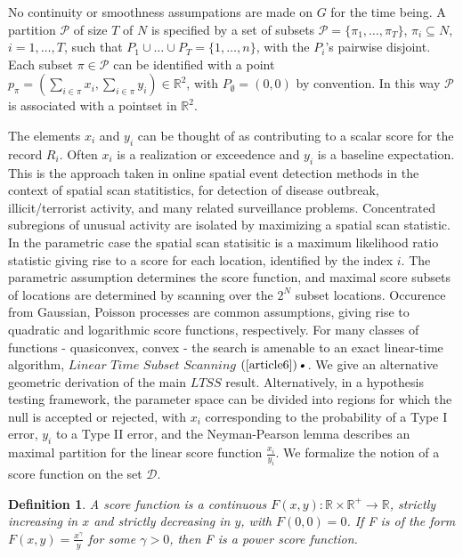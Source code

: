 \documentclass{article}
\newtheorem{definition}{Definition}
\theoremstyle{case}
\begin{document}
No continuity or smoothness assumpations are made on $G$ for the time being. A partition $\mathcal{P}$ of size $T$ of $N$ is specified by a set of subsets $\mathcal{P} = \{ \pi_1, \dots, \pi_T \}$, $\pi_i \subseteq N$, $i = 1, \dots, T$, such that $P_1 \cup \dots \cup P_T = \{1, \dots, n\}$, with the $P_i$'s pairwise disjoint. Each subset $\pi \in \mathcal{P}$ can be identified with a point $p_\pi = (\sum_{i \in \pi} x_i, \sum_{i \in \pi}y_i) \in \mathbb{R}^2$, with $P_{\emptyset} = (0,0)$ by convention. In this way $\mathcal{P}$ is associated with a pointset in $\mathbb{R}^2$.

The elements $x_i$ and $y_i$ can be thought of as contributing to a scalar score for the record $R_i$. Often $x_i$ is a realization or exceedence and $y_i$ is a baseline expectation. This is the approach taken in online spatial event detection methods in the context of spatial scan statitistics, for detection of disease outbreak, illicit/terrorist activity, and many related surveillance problems. Concentrated subregions of unusual activity are isolated by maximizing a spatial scan statistic. In the parametric case the spatial scan statisitic is a maximum likelihood ratio statistic giving rise to a score for each location, identified by the index $i$. The parametric assumption determines the score function, and maximal score subsets of locations are determined by scanning over the $2^N$ subset locations. Occurence from Gaussian, Poisson processes are common assumptions, giving rise to quadratic and logarithmic score functions, respectively. For many classes of functions - quasiconvex, convex - the search is amenable to an exact linear-time algorithm, $\textit{Linear Time Subset Scanning}$ $(\cite{article6})\textsl{•}$. We give an alternative geometric derivation of the main $LTSS$ result. Alternatively, in a hypothesis testing framework, the parameter space can be divided into regions for which the null is accepted or rejected, with $x_i$ corresponding to the probability of a Type I error, $y_i$ to a Type II error, and the Neyman-Pearson lemma describes an maximal partition for the linear score function $\frac{x_i}{y_i}$. We formalize the notion of a score function on the set $\mathcal{D}$.


\begin{definition}
A score function is a continuous $F(x, y)\colon \mathbb{R} \times \mathbb{R}^{+} \to \mathbb{R}$, strictly increasing in $x$ and strictly decreasing in $y$, with $F\left( 0,0\right) = 0$. If F is of the form $F(x,y) = \frac{x^\gamma}{y}$ for some $\gamma > 0$, then F is a power score function. 
\end{definition}
\end{document}
